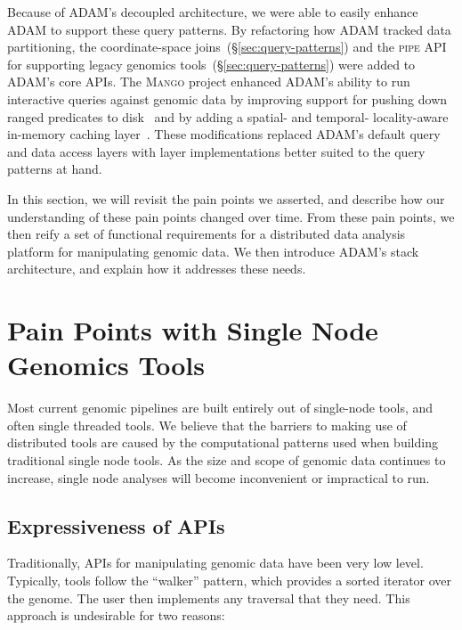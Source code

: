 \documentclass[phd]{ucbthesis}
\begin{document}
Because of \textsc{ADAM}'s decoupled architecture, we were able to easily
enhance \textsc{ADAM} to support these query patterns. By refactoring how
\textsc{ADAM} tracked data partitioning, the coordinate-space
joins~(\S\ref{sec:query-patterns}) and the \textsc{pipe} API for supporting
legacy genomics tools~(\S\ref{sec:query-patterns}) were added to \textsc{ADAM}'s
core APIs. The \textsc{Mango} project enhanced \textsc{ADAM}'s ability to run
interactive queries against genomic data by improving support for pushing down
ranged predicates to disk~\cite{tu16} and by adding a spatial- and temporal-
locality-aware in-memory caching layer~\cite{morrow17}. These modifications
replaced \textsc{ADAM}'s default query and data access layers with layer
implementations better suited to the query patterns at hand.

In this section, we will revisit the pain points we asserted, and describe
how our understanding of these pain points changed over time. From these pain
points, we then reify a set of functional requirements for a distributed data
analysis platform for manipulating genomic data. We then introduce
\textsc{ADAM}'s stack architecture, and explain how it addresses these needs.

\section{Pain Points with Single Node Genomics Tools}
\label{sec:pain-points}

Most current genomic pipelines are built entirely out of single-node tools,
and often single threaded tools. We believe that the barriers to making
use of distributed tools are caused by the computational patterns used when
building traditional single node tools. As the size and scope of genomic data
continues to increase, single node analyses will become inconvenient or
impractical to run.

\subsection{Expressiveness of APIs}
\label{sec:api-levels}

Traditionally, APIs for manipulating genomic data have been very low level.
Typically, tools follow the ``walker'' pattern, which provides a sorted
iterator over the genome. The user then implements any traversal that they need.
This approach is undesirable for two reasons:
\end{document}
